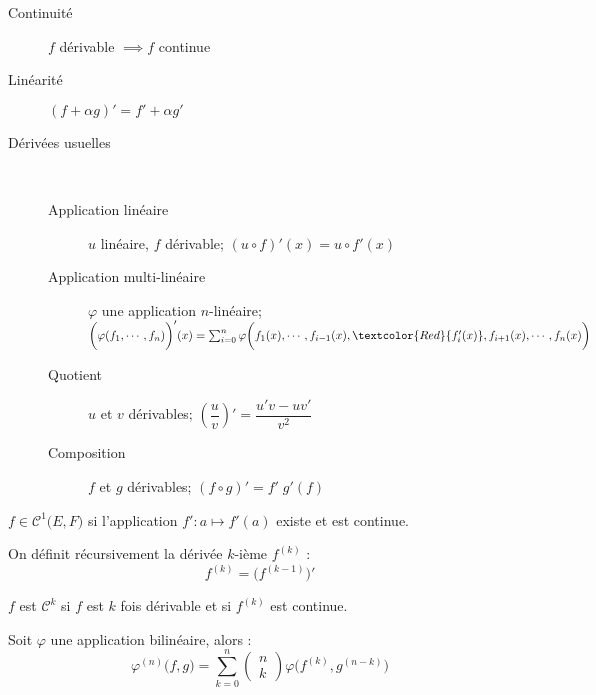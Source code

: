 \documentclass[11pt,a4paper,fleqn,pdftex]{report}
\begin{document}
\begin{prop}
\begin{description}
    \item[Continuité] $f$ dérivable $\implies f$ continue
    \item[Linéarité] $\left( f + \alpha g \right)' = f' + \alpha g'$
    \item[Dérivées usuelles] \hfill \\[-0.5cm]
        \begin{description}
            \item[Application linéaire] $u$ linéaire, $f$ dérivable; $\left( u \circ f \right)'(x) = u\circ f'(x)$
            \item[Application multi-linéaire] $\varphi$ une application $n$-linéaire;\\ 
            $\bigg( \varphi (f_1, \cdots, f_n) \bigg)'(x) = \sum_{i=0}^n \varphi \bigg( f_1(x), \cdots, f_{i-1}(x), \textcolor{Red}{f_i'(x)},f_{i+1}(x), \cdots , f_n(x) \bigg)$
            \item[Quotient] $u$ et $v$ dérivables; $\left( \dfrac{u}{v} \right)' = \dfrac{u'v - uv'}{v^2}$
            \item[Composition] $f$ et $g$ dérivables; $\left( f \circ g \right)' = f'\; g'(f)$
        \end{description}
\end{description}
\end{prop}

\begin{dfn}
$f \in \mathcal{C}^1\big( E,F \big)$ si l'application $f' : a \mapsto f'(a)$ existe et est continue.
\end{dfn}


\begin{dfn}
On définit récursivement la dérivée $k$-ième $f^{(k)}$ : 
\begin{equation}
    f^{(k)}=\big( f^{(k-1)} \big) '
\end{equation}
\end{dfn}
\begin{dfn}
$f$ est $\mathcal{C}^k$ si $f$ est $k$ fois dérivable et si $f^{(k)}$ est continue.
\end{dfn}

\begin{theorem}
Soit $\varphi$ une application bilinéaire, alors :
\begin{equation}\tag{Leibniz}\label{Leibniz}
\varphi^{(n)}\big( f,g \big) = \sum_{k=0}^n \begin{pmatrix} n \\ k \end{pmatrix} \varphi \big( f^{(k)},g^{(n-k)} \big)
\end{equation}
\end{theorem}
\end{document}
